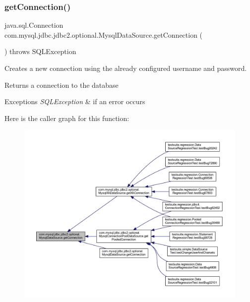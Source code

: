 \subsubsection{\texorpdfstring{get\+Connection()}{getConnection()}\hspace{0.1cm}{\footnotesize\ttfamily [1/3]}}
{\footnotesize\ttfamily java.\+sql.\+Connection com.\+mysql.\+jdbc.\+jdbc2.\+optional.\+Mysql\+Data\+Source.\+get\+Connection (\begin{DoxyParamCaption}{ }\end{DoxyParamCaption}) throws S\+Q\+L\+Exception}

Creates a new connection using the already configured username and password.

\begin{DoxyReturn}{Returns}
a connection to the database
\end{DoxyReturn}

\begin{DoxyExceptions}{Exceptions}
{\em S\+Q\+L\+Exception} & if an error occurs \\
\hline
\end{DoxyExceptions}
Here is the caller graph for this function\+:
\nopagebreak
\begin{figure}[H]
\begin{center}
\leavevmode
\includegraphics[width=350pt]{classcom_1_1mysql_1_1jdbc_1_1jdbc2_1_1optional_1_1_mysql_data_source_aa19c209327ac343921cb8b4f2e2b30ab_icgraph}
\end{center}
\end{figure}
\mbox{\label{classcom_1_1mysql_1_1jdbc_1_1jdbc2_1_1optional_1_1_mysql_data_source_a63e6a1f58e687db6972674f2e2427141}} 
